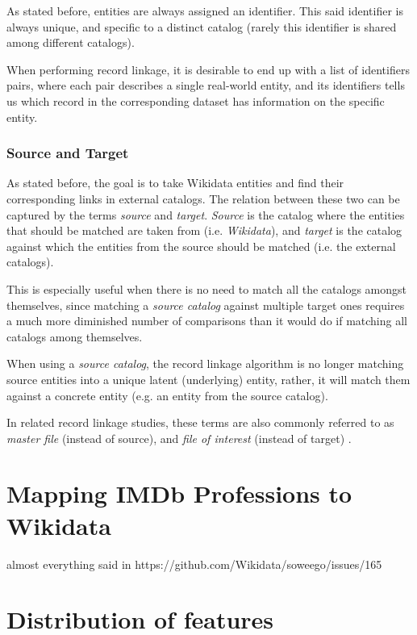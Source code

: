 \documentclass[epsfig,a4paper,11pt,titlepage,twoside,openany]{book}
\begin{document}
As stated before, entities are always assigned an identifier. This said identifier is always unique, and specific to a distinct catalog (rarely this identifier is shared among different catalogs). 

When performing record linkage, it is desirable to end up with a list of identifiers pairs, where each pair describes a single real-world entity, and its identifiers tells us which record in the corresponding dataset has information on the specific entity.


\subsubsection{Source and Target}
\label{sec:rl-term-source-and-target}

As stated before, the goal is to take Wikidata entities and find their corresponding links in external catalogs. The relation between these two can be captured by the terms \textit{source} and \textit{target}. \textit{Source} is the catalog where the entities that should be matched are taken from (i.e. \textit{Wikidata}), and \textit{target} is the catalog against which the entities from the source should be matched (i.e. the external catalogs).

This is especially useful when there is no need to match all the catalogs amongst
themselves, since matching a \textit{source catalog} against multiple target ones
requires a much more diminished number of comparisons than it would do if matching all catalogs among themselves.

When using a \textit{source catalog}, the record linkage algorithm is no longer matching
source entities into a unique latent (underlying) entity, rather, it will match
them against a concrete entity (e.g. an entity from the source catalog).

In related record linkage studies, these terms are also commonly referred to as \cite{Sayers2015}
\textit{master file} (instead of source), and \textit{file of interest} (instead
of target) .
   

\section{Mapping IMDb Professions to Wikidata}
\label{sec:imdb-profs-to-wikidata}

almost everything said in https://github.com/Wikidata/soweego/issues/165


\section{Distribution of features}
\label{sec:apx-feature-distribution}
\end{document}
